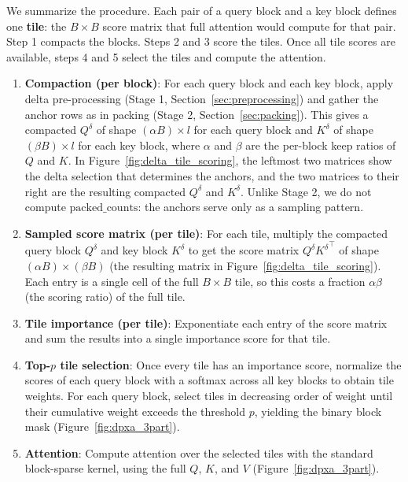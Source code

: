 We summarize the procedure. Each pair of a query block and a key block defines one \textbf{tile}: the $B \times B$ score matrix that full attention would compute for that pair. Step 1 compacts the blocks. Steps 2 and 3 score the tiles. Once all tile scores are available, steps 4 and 5 select the tiles and compute the attention.

\begin{enumerate}
    \item \textbf{Compaction (per block)}: For each query block and each key block, apply delta pre-processing (Stage 1, Section~\ref{sec:preprocessing}) and gather the anchor rows as in packing (Stage 2, Section~\ref{sec:packing}). This gives a compacted $Q^\delta$ of shape $(\alpha B) \times l$ for each query block and $K^\delta$ of shape $(\beta B) \times l$ for each key block, where $\alpha$ and $\beta$ are the per-block keep ratios of $Q$ and $K$. In Figure~\ref{fig:delta_tile_scoring}, the leftmost two matrices show the delta selection that determines the anchors, and the two matrices to their right are the resulting compacted $Q^\delta$ and $K^\delta$. Unlike Stage 2, we do not compute $\text{packed\_counts}$: the anchors serve only as a sampling pattern.

    \item \textbf{Sampled score matrix (per tile)}: For each tile, multiply the compacted query block $Q^\delta$ and key block $K^\delta$ to get the score matrix $Q^\delta {K^\delta}^\top$ of shape $(\alpha B) \times (\beta B)$ (the resulting matrix in Figure~\ref{fig:delta_tile_scoring}). Each entry is a single cell of the full $B \times B$ tile, so this costs a fraction $\alpha \beta$ (the scoring ratio) of the full tile.

    \item \textbf{Tile importance (per tile)}: Exponentiate each entry of the score matrix and sum the results into a single importance score for that tile.

    \item \textbf{Top-$p$ tile selection}: Once every tile has an importance score, normalize the scores of each query block with a softmax across all key blocks to obtain tile weights. For each query block, select tiles in decreasing order of weight until their cumulative weight exceeds the threshold $p$, yielding the binary block mask (Figure~\ref{fig:dpxa_3part}).

    \item \textbf{Attention}: Compute attention over the selected tiles with the standard block-sparse kernel, using the full $Q$, $K$, and $V$ (Figure~\ref{fig:dpxa_3part}).
\end{enumerate}

